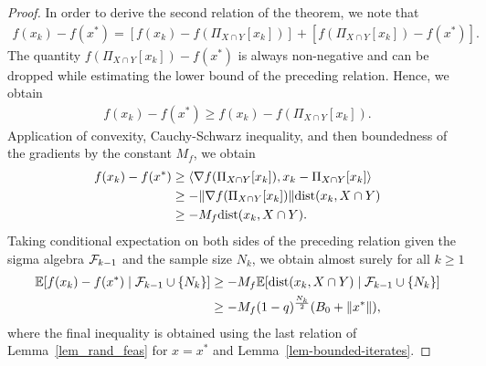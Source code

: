 \documentclass{article}
\def\la{\langle}
\def\ra{\rangle}
\def\cF{{\cal F}}
\def\dist{{\rm dist}}
\newcommand{\EXP}[1]
{\mathbb{E}\!\left[#1\right] }
\theoremstyle{plain}
\theoremstyle{definition}
\theoremstyle{remark}
\begin{document}
\begin{proof}
In order to derive the second relation of the theorem, we note that
\begin{align}
    f(x_k) - f(x^*) = [f(x_k) - f(\Pi_{X \cap Y} [x_k])] + [f(\Pi_{X \cap Y} [x_k]) - f(x^*)] . \nonumber
\end{align}
The quantity $f(\Pi_{X \cap Y} [x_k]) - f(x^*)$ is always non-negative and can be dropped while estimating the lower bound of the preceding relation. Hence, we obtain
\begin{align}
    f(x_k) - f(x^*) \geq f(x_k) - f(\Pi_{X \cap Y} [x_k]). \nonumber
\end{align}
Application of convexity, Cauchy-Schwarz inequality, and then boundedness of the gradients by the constant $M_f$, we obtain
\begin{align}
    f(x_k) - f(x^*) &\geq \la \nabla f(\Pi_{X \cap Y} [x_k]), x_k - \Pi_{X \cap Y} [x_k] \ra \nonumber\\
    & \geq - \|\nabla f(\Pi_{X \cap Y} [x_k])\| \dist(x_k,X \cap Y) \nonumber\\
    & \geq - M_f \dist(x_k,X \cap Y) . \nonumber
\end{align}
Taking conditional expectation on both sides of the preceding relation given the sigma algebra $\cF_{k-1}$ and the sample size $N_k$, we obtain almost surely for all $k \geq 1$
\begin{align}
    \EXP{f(x_k) - f(x^*) \mid \cF_{k-1} \cup \{N_k\}} & \geq - M_f \EXP{\dist(x_k,X \cap Y) \mid \cF_{k-1} \cup \{N_k\}} \nonumber\\
    & \geq - M_f (1-q)^{\frac{N_k}{2}} (B_0 + \|x^*\|) , \nonumber
\end{align}
where the final inequality is obtained using the last relation of Lemma~\ref{lem_rand_feas} for $x = x^*$ and Lemma~\ref{lem-bounded-iterates}.


\end{proof}
\end{document}

